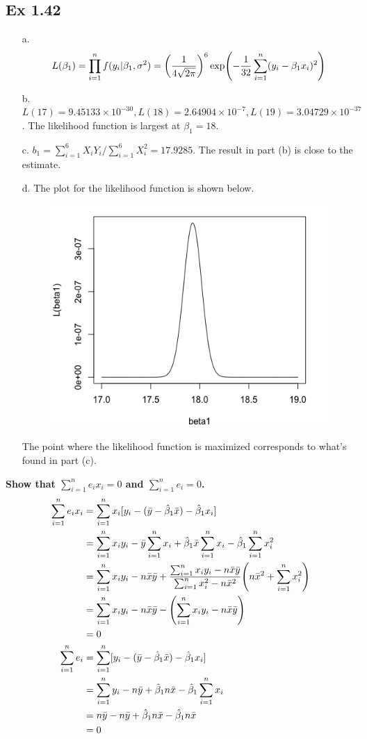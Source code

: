 \documentclass[10pt]{report}
\newcommand{\ds}{\displaystyle}
\DeclarePairedDelimiter\autoparen{(}{)}
\newcommand{\pa}[1]{\autoparen*{#1}}
\begin{document}
\subsection*{Ex 1.42}
\begin{enumerate}
	\item [a.]
	\[
	L(\beta_1) = \prod_{i=1}^{n} f(y_i | \beta_1, \sigma^2) = \pa{\frac{1}{4\sqrt{2\pi}}}^6 \exp\pa{-\frac{1}{32} \sum_{i=1}^{n} (y_i - \beta_1 x_i)^2}
	\]
	
	\item [b.]
	$L(17) = 9.45133\times 10^{-30}, L(18) = 2.64904\times 10^{-7}, L(19) = 3.04729\times 10^{-37}$. The likelihood function is largest at $\beta_1 = 18$.
	
	\item [c.]
	$b_1 = \sum_{i=1}^{6} X_i Y_i / \sum_{i=1}^{6} X_i^2 = 17.9285$. The result in part (b) is close to the estimate.
	
	\item [d.]
	The plot for the likelihood function is shown below.
	\begin{figure}[H]
		\centering
		\includegraphics[width=.5\linewidth]{42d.png}
	\end{figure}
	The point where the likelihood function is maximized corresponds to what's found in part (c).
\end{enumerate}

{\large\bf Show that $\ds \sum_{i=1}^{n} e_i x_i = 0$ and $\ds \sum_{i=1}^{n} e_i = 0$.}
\begin{align*}
	\sum_{i=1}^{n} e_i x_i
	&= \sum_{i=1}^{n} x_i[y_i - (\bar{y} - \hat{\beta}_1 \bar{x}) - \hat{\beta}_1 x_i]\\
	&= \sum_{i=1}^{n} x_i y_i - \bar{y}\sum_{i=1}^{n}x_i + \hat{\beta}_1 \bar{x} \sum_{i=1}^{n} x_i - \hat{\beta}_1 \sum_{i=1}^{n} x_i^2\\
	&= \sum_{i=1}^{n} x_i y_i - n\bar{x}\bar{y} + \frac{\sum_{i=1}^{n} x_i y_i - n\bar{x}\bar{y}}{\sum_{i=1}^{n} x_i^2 - n\bar{x}^2}\pa{n\bar{x}^2 + \sum_{i=1}^{n} x_i^2}\\
	&= \sum_{i=1}^{n} x_i y_i - n\bar{x}\bar{y} - \pa{\sum_{i=1}^{n} x_i y_i - n\bar{x}\bar{y}}\\
	&= 0\\
	\sum_{i=1}^{n} e_i
	&= \sum_{i=1}^{n} [y_i - (\bar{y} - \hat{\beta}_1 \bar{x}) - \hat{\beta}_1 x_i]\\
	&= \sum_{i=1}^{n} y_i - n\bar{y} + \hat{\beta}_1 n\bar{x} - \hat{\beta}_1 \sum_{i=1}^{n} x_i\\
	&= n\bar{y} - n\bar{y} + \hat{\beta}_1 n\bar{x} - \hat{\beta}_1 n\bar{x}\\
	&= 0
\end{align*}
\end{document}

